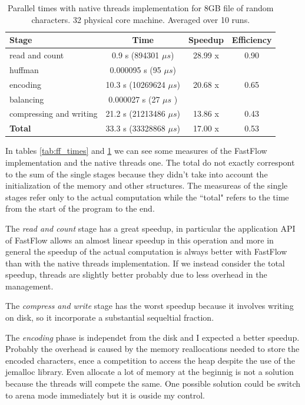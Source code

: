\documentclass[12pt, letterpaper]{article}
\begin{document}
\begin{table}[h]
\begin{center}
\begin{tabular}{l c c c}
    \textbf{Stage} & \textbf{Time} & \textbf{Speedup} & \textbf{Efficiency}  \\
    \hline
    read and count & 0.9 s (894301 $\mu s$)  & 28.99 x & 0.90  \\
    \hline
    huffman & 0.000095 s (95 $\mu s$) & \\
    \hline
    encoding & 10.3 s (10269624 $\mu s$)  & 20.68 x & 0.65 \\
    \hline
    balancing & 0.000027 s (27 $\mu s$ ) & \\
    \hline
    compressing and writing & 21.2 s (21213486 $\mu s$)  & 13.86 x & 0.43\\
    \hline
    \textbf{Total} & 33.3 s (33328868 $\mu s$)  & 17.00 x & 0.53 \\ 
\end{tabular}
\caption{Parallel times with native threads implementation for 8GB file of random characters. 32 physical core machine. Averaged over 10 runs.}    
\label{tab:thr_times}
\end{center}
\end{table}

In tables \ref{tab:ff_times} and \ref{tab:thr_times} we can see some measures of the FastFlow implementation and the native threads one. The total do not exactly correspont to the sum of the single stages because they didn't take into account the initialization of the memory and other structures. The measureas of the single stages refer only to the actual computation while the ``total" refers to the time from the start of the program to the end.

The \textit{read and count} stage has a great speedup, in particular the application API of FastFlow allows an almost linear speedup in this operation and more in general the speedup of the actual computation is always better with FastFlow than with the native threads implementation. If we instead consider the total speedup, threads are slightly better probably due to less overhead in the management. 

The \textit{compress and write} stage has the worst speedup because it involves writing on disk, so it incorporate a substantial sequeltial fraction. 

The \textit{encoding} phase is independet from the disk and I expected a better speedup. Probably the overhead is caused by the memory reallocations needed to store the encoded characters, ence a competition to access the heap despite the use of the jemalloc library. Even allocate a lot of memory at the beginnig is not a solution because the threads will compete the same. One possible solution could be switch to arena mode immediately but it is ouside my control.
\end{document}
